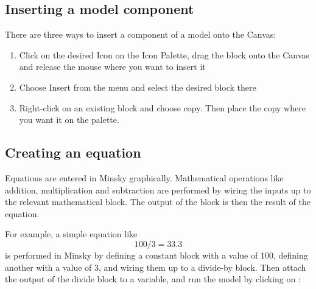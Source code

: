 \subsection{Inserting a model component}


There are three ways to insert a component of a model onto the Canvas:
\begin{enumerate}
\item Click on the desired Icon on the Icon Palette, drag the block
onto the Canvas and release the mouse where you want to insert it 

\begin{center}
\end{center}

\item Choose Insert from the menu and select the desired block there

  \begin{center}
  \end{center}
  \newpage
  
\item Right-click on an existing block and choose copy. Then place the
copy where you want it on the palette. 

\begin{center}
\end{center}


\end{enumerate}

\subsection{Creating an equation}

Equations are entered in Minsky graphically. Mathematical operations
like addition, multiplication and subtraction are performed by wiring
the inputs up to the relevant mathematical block. The output of the
block is then the result of the equation. 

For example, a simple equation like
\begin{displaymath}
100/3 = 33.3
\end{displaymath}
is performed in Minsky by defining a constant block with a value of 100, defining another with a value of 3, and wiring them up to a divide-by block. Then attach the output of the divide block to a variable, and run the model by clicking on :


